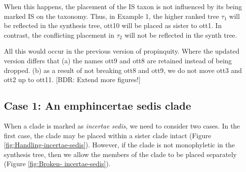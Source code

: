 \documentclass[english]{article}
\begin{document}
When this happens, the placement of the IS taxon is not influenced by
its being marked IS on the taxonomy. Thus, in Example 1, the higher
ranked tree $\tau_{1}$ will be reflected in the synthesis tree, ott10
will be placed as sister to ott1. In contrast, the conflicting
placement in $\tau_{2}$ will not be reflected in the synth tree.

All this would occur in the previous version of propinquity. Where the
updated version differs that (a) the names ott9 and ott8 are retained
instead of being dropped. (b) as a result of not breaking ott8 and
ott9, we do not move ott3 and ott2 up to ott11. {[}BDR: Extend more
figures!{]}

\subsection{Case 1: An emph{incertae sedis} clade}

When a clade is marked as \emph{incertae sedis}, we need to consider
two cases. In the first case, the clade may be placed within a sister
clade intact (Figure \ref{fig:Handling-incertae-sedis}). However, if
the clade is not monophyletic in the synthesis tree, then we allow the
members of the clade to be placed separately (Figure \ref{fig:Broken-
incertae-sedis}).
\end{document}
